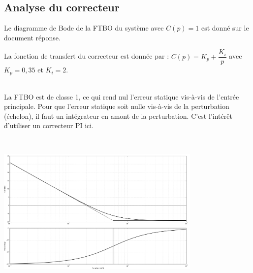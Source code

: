 \subsection{Analyse du correcteur}
Le diagramme de Bode de la FTBO du système avec $C(p)=1$ est donné sur le document réponse. 
%

\ifprof
\begin{corrige}
\end{corrige}
\else
\fi

La fonction de transfert du correcteur est donnée par : $C(p)=K_p + \dfrac{K_i}{p}$ avec $K_p = 0,35$ et $K_i = 2$.

\ifprof
\begin{corrige} ~\\
La FTBO est de classe 1, ce qui rend nul l'erreur statique vis-à-vis de l'entrée principale. Pour que l'erreur statique soit nulle vis-à-vis de la perturbation (échelon), il faut un intégrateur en amont de la perturbation. C'est l'intérêt d'utiliser un correcteur PI ici. 
\end{corrige}
\else
\fi


\ifprof
\begin{corrige} ~\\
\begin{center}
\includegraphics[width=0.75\textwidth]{images/bode_PI.png}
\end{center}
\end{corrige}
\else
\fi

